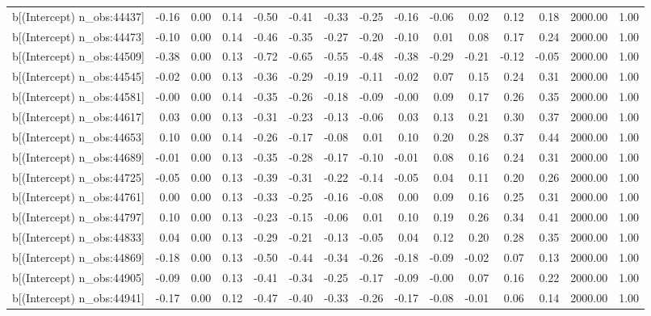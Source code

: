 \begin{table}[ht]
\begin{tabular}{rrrrrrrrrrrrrrr}
  b[(Intercept) n\_obs:44437] & -0.16 & 0.00 & 0.14 & -0.50 & -0.41 & -0.33 & -0.25 & -0.16 & -0.06 & 0.02 & 0.12 & 0.18 & 2000.00 & 1.00 \\ 
  b[(Intercept) n\_obs:44473] & -0.10 & 0.00 & 0.14 & -0.46 & -0.35 & -0.27 & -0.20 & -0.10 & 0.01 & 0.08 & 0.17 & 0.24 & 2000.00 & 1.00 \\ 
  b[(Intercept) n\_obs:44509] & -0.38 & 0.00 & 0.13 & -0.72 & -0.65 & -0.55 & -0.48 & -0.38 & -0.29 & -0.21 & -0.12 & -0.05 & 2000.00 & 1.00 \\ 
  b[(Intercept) n\_obs:44545] & -0.02 & 0.00 & 0.13 & -0.36 & -0.29 & -0.19 & -0.11 & -0.02 & 0.07 & 0.15 & 0.24 & 0.31 & 2000.00 & 1.00 \\ 
  b[(Intercept) n\_obs:44581] & -0.00 & 0.00 & 0.14 & -0.35 & -0.26 & -0.18 & -0.09 & -0.00 & 0.09 & 0.17 & 0.26 & 0.35 & 2000.00 & 1.00 \\ 
  b[(Intercept) n\_obs:44617] & 0.03 & 0.00 & 0.13 & -0.31 & -0.23 & -0.13 & -0.06 & 0.03 & 0.13 & 0.21 & 0.30 & 0.37 & 2000.00 & 1.00 \\ 
  b[(Intercept) n\_obs:44653] & 0.10 & 0.00 & 0.14 & -0.26 & -0.17 & -0.08 & 0.01 & 0.10 & 0.20 & 0.28 & 0.37 & 0.44 & 2000.00 & 1.00 \\ 
  b[(Intercept) n\_obs:44689] & -0.01 & 0.00 & 0.13 & -0.35 & -0.28 & -0.17 & -0.10 & -0.01 & 0.08 & 0.16 & 0.24 & 0.31 & 2000.00 & 1.00 \\ 
  b[(Intercept) n\_obs:44725] & -0.05 & 0.00 & 0.13 & -0.39 & -0.31 & -0.22 & -0.14 & -0.05 & 0.04 & 0.11 & 0.20 & 0.26 & 2000.00 & 1.00 \\ 
  b[(Intercept) n\_obs:44761] & 0.00 & 0.00 & 0.13 & -0.33 & -0.25 & -0.16 & -0.08 & 0.00 & 0.09 & 0.16 & 0.25 & 0.31 & 2000.00 & 1.00 \\ 
  b[(Intercept) n\_obs:44797] & 0.10 & 0.00 & 0.13 & -0.23 & -0.15 & -0.06 & 0.01 & 0.10 & 0.19 & 0.26 & 0.34 & 0.41 & 2000.00 & 1.00 \\ 
  b[(Intercept) n\_obs:44833] & 0.04 & 0.00 & 0.13 & -0.29 & -0.21 & -0.13 & -0.05 & 0.04 & 0.12 & 0.20 & 0.28 & 0.35 & 2000.00 & 1.00 \\ 
  b[(Intercept) n\_obs:44869] & -0.18 & 0.00 & 0.13 & -0.50 & -0.44 & -0.34 & -0.26 & -0.18 & -0.09 & -0.02 & 0.07 & 0.13 & 2000.00 & 1.00 \\ 
  b[(Intercept) n\_obs:44905] & -0.09 & 0.00 & 0.13 & -0.41 & -0.34 & -0.25 & -0.17 & -0.09 & -0.00 & 0.07 & 0.16 & 0.22 & 2000.00 & 1.00 \\ 
  b[(Intercept) n\_obs:44941] & -0.17 & 0.00 & 0.12 & -0.47 & -0.40 & -0.33 & -0.26 & -0.17 & -0.08 & -0.01 & 0.06 & 0.14 & 2000.00 & 1.00 \\ 

\end{tabular}
\end{table}
